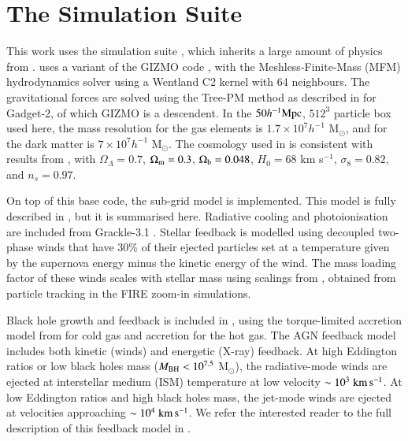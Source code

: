 \section{The \simba{} Simulation Suite}
\label{sec:simba}

This work uses the \simba{} simulation suite \citep{Dave2019}, which inherits a
large amount of physics from \mufasa{} \citep{Dave2016}. \simba{} uses a
variant of the GIZMO code \citep{Hopkins2015}, with the Meshless-Finite-Mass
(MFM) hydrodynamics solver using a Wentland C2 kernel with 64 neighbours. The
gravitational forces are solved using the Tree-PM method as described in
\citet{Springel2005b} for Gadget-2, of which GIZMO is a descendent. In the $50 h^{-1}{\rm Mpc}{}$, $512^3$ particle box used here, the mass resolution for the gas elements is $1.7\times10^7h^{-1}$ M$_\odot$, and for the dark matter is $7\times10^7h^{-1}$ M$_\odot$. The cosmology used in \simba{} is consistent with results from
\citet{PlanckCollaboration2016}, with $\Omega_\Lambda = 0.7$, $\Omega_{\rm m} =
0.3$, $\Omega_{\rm b} = 0.048$, $H_0 = 68$ km s$^{-1}$, $\sigma_8=0.82$, and
$n_s=0.97$.

On top of this base code, the \simba{} sub-grid model is implemented. This
model is fully described in \citet{Dave2019}, but it is summarised here.
Radiative cooling and photoionisation are included from Grackle-3.1
\citep{Smith2016}. Stellar feedback is modelled using decoupled two-phase winds
that have 30\% of their ejected particles set at a temperature given by the
supernova energy minus the kinetic energy of the wind. The mass
loading factor of these winds scales with stellar mass using scalings from
\citet{AnglesAlcazar2017}, obtained from particle tracking in the FIRE zoom-in simulations.

Black hole growth and feedback is included in \simba{}, using the torque-limited
accretion model from \citet{AnglesAlcazar2017b} for cold gas and \citet{Bondi1952}
accretion for the hot gas. The AGN feedback model includes both kinetic
(winds) and energetic (X-ray) feedback. At high Eddington ratios or low black holes mass ($M_{\rm BH} < 10^{7.5}$
M$_\odot$), the
radiative-mode winds are ejected at interstellar medium (ISM) temperature at low velocity $\sim 10^3 \;{\rm km}\,{\rm s}^{-1}{}$. At low Eddington ratios and high black holes mass, the jet-mode winds are ejected at velocities approaching $\sim 10^4\;{\rm km}\,{\rm s}^{-1}{}$. We refer the interested reader to the full description of this
feedback model in \citet{Dave2019}.

